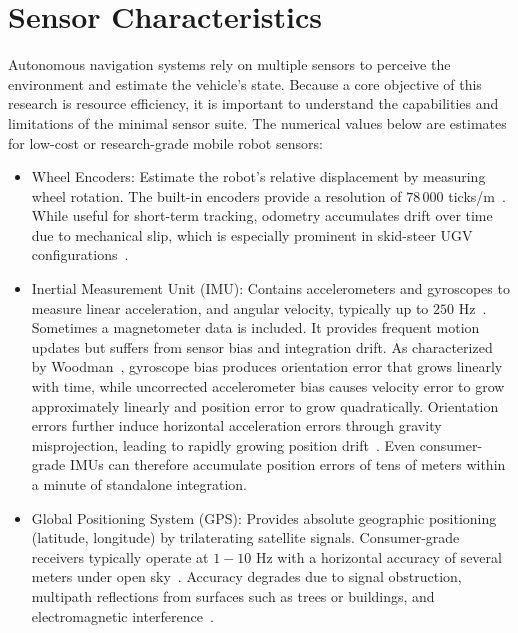 \section{Sensor Characteristics}
\label{sec:sensor-characteristics}

Autonomous navigation systems rely on multiple sensors to perceive the environment and estimate the vehicle's state. Because a core objective of this research is resource efficiency, it is important to understand the capabilities and limitations of the minimal sensor suite. The numerical values below are estimates for low-cost or research-grade mobile robot sensors:
\begin{itemize}
\item Wheel Encoders: Estimate the robot's relative displacement by measuring wheel rotation. The built-in encoders provide a resolution of $78\,000$ ticks/m~\cite{clearpath_husky}. While useful for short-term tracking, odometry accumulates drift over time due to mechanical slip, which is especially prominent in skid-steer UGV configurations~\cite{mandow2007kinematics}.

\item Inertial Measurement Unit (IMU): Contains accelerometers and gyroscopes to measure linear acceleration, and angular velocity, typically up to $250\text{ Hz}$~\cite{phidgets1042}. Sometimes a magnetometer data is included. It provides frequent motion updates but suffers from sensor bias and integration drift. As characterized by Woodman~\cite{woodman2007inertial}, gyroscope bias produces orientation error that grows linearly with time, while uncorrected accelerometer bias causes velocity error to grow approximately linearly and position error to grow quadratically. Orientation errors further induce horizontal acceleration errors through gravity misprojection, leading to rapidly growing position drift~\cite{woodman2007inertial}. Even consumer-grade IMUs can therefore accumulate position errors of tens of meters within a minute of standalone integration.

\item Global Positioning System (GPS): Provides absolute geographic positioning (latitude, longitude) by trilaterating satellite signals. Consumer-grade receivers typically operate at $1-10\text{ Hz}$ with a horizontal accuracy of several meters under open sky~\cite{ublox2011neo6}. Accuracy degrades due to signal obstruction, multipath reflections from surfaces such as trees or buildings, and electromagnetic interference~\cite{schmidt2025vislam}.


\end{itemize}
